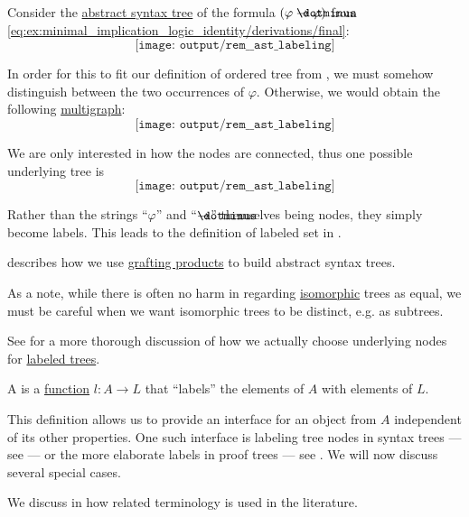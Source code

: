 \begin{remark}\label{rem:ast_labeling}
  Consider the \hyperref[def:propositional_formula_ast]{abstract syntax tree} of the formula \( (\varphi \synimplies \varphi) \) from \eqref{eq:ex:minimal_implication_logic_identity/derivations/final}:
  \begin{equation*}
    \texttt{[image: output/rem\_\_ast\_labeling]}
  \end{equation*}

  In order for this to fit our definition of ordered tree from , we must somehow distinguish between the two occurrences of \( \varphi \). Otherwise, we would obtain the following \hyperref[def:hypergraph/multigraph]{multigraph}:
  \begin{equation*}
    \texttt{[image: output/rem\_\_ast\_labeling]}
  \end{equation*}

  We are only interested in how the nodes are connected, thus one possible underlying tree is
  \begin{equation*}
    \texttt{[image: output/rem\_\_ast\_labeling]}
  \end{equation*}

  Rather than the strings \enquote{\( \varphi \)} and \enquote{\( \synimplies \)} themselves being nodes, they simply become labels. This leads to the definition of labeled set in .

   describes how we use \hyperref[def:ordered_tree_grafting_product]{grafting products} to build abstract syntax trees.

  As a note, while there is often no harm in regarding \hyperref[def:labeled_tree/homomorphism]{isomorphic} trees as equal, we must be careful when we want isomorphic trees to be distinct, e.g. as subtrees.
\end{remark}
\begin{comments}
  \item See  for a more thorough discussion of how we actually choose underlying nodes for \hyperref[def:labeled_tree]{labeled trees}.
\end{comments}

\begin{definition}\label{def:labeled_set}\mimprovised
  A  is a \hyperref[def:function]{function} \( l: A \to L \) that \enquote{labels} the elements of \( A \) with elements of \( L \).
\end{definition}
\begin{comments}
  \item This definition allows us to provide an interface for an object from \( A \) independent of its other properties. One such interface is labeling tree nodes in syntax trees --- see  --- or the more elaborate labels in proof trees --- see . We will now discuss several special cases.

  \item We discuss in  how related terminology is used in the literature.
\end{comments}

